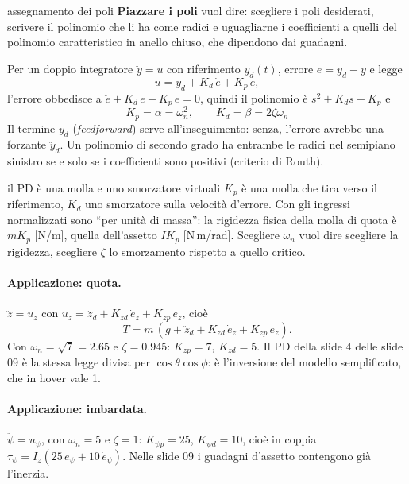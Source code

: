 \documentclass[11pt,a4paper]{article}
\begin{document}
\begin{teoria}{assegnamento dei poli}
\textbf{Piazzare i poli} vuol dire: scegliere i poli desiderati, scrivere il polinomio che li ha come radici e uguagliarne i coefficienti a quelli del polinomio caratteristico in anello chiuso, che dipendono dai guadagni.

Per un doppio integratore $\ddot y = u$ con riferimento $y_d(t)$, errore $e = y_d - y$ e legge
\[
u = \ddot y_d + K_d\,\dot e + K_p\,e ,
\]
l'errore obbedisce a $\ddot e + K_d\,\dot e + K_p\,e = 0$, quindi il polinomio è $s^2 + K_d s + K_p$ e
\[
\boxed{\ K_p = \alpha = \omega_n^2, \qquad K_d = \beta = 2\zeta\omega_n\ }
\]
Il termine $\ddot y_d$ (\emph{feedforward}) serve all'inseguimento: senza, l'errore avrebbe una forzante $\ddot y_d$. Un polinomio di secondo grado ha entrambe le radici nel semipiano sinistro se e solo se i coefficienti sono positivi (criterio di Routh).
\end{teoria}

\begin{fisica}{il PD è una molla e uno smorzatore virtuali}
$K_p$ è una molla che tira verso il riferimento, $K_d$ uno smorzatore sulla velocità d'errore. Con gli ingressi normalizzati sono ``per unità di massa'': la rigidezza fisica della molla di quota è $m K_p$ [N/m], quella dell'assetto $I K_p$ [N\,m/rad]. Scegliere $\omega_n$ vuol dire scegliere la rigidezza, scegliere $\zeta$ lo smorzamento rispetto a quello critico.
\end{fisica}

\paragraph{Applicazione: quota.} $\ddot z = u_z$ con $u_z = \ddot z_d + K_{zd}\,\dot e_z + K_{zp}\,e_z$, cioè
\[
T = m\,(g + \ddot z_d + K_{zd}\,\dot e_z + K_{zp}\,e_z).
\]
Con $\omega_n = \sqrt 7 = 2.65$ e $\zeta = 0.945$: $K_{zp} = 7$, $K_{zd} = 5$. Il PD della slide 4 delle slide 09 è la stessa legge divisa per $\cos\theta\cos\phi$: è l'inversione del modello semplificato, che in hover vale 1.

\paragraph{Applicazione: imbardata.} $\ddot\psi = u_\psi$, con $\omega_n = 5$ e $\zeta = 1$: $K_{\psi p} = 25$, $K_{\psi d} = 10$, cioè in coppia $\tau_\psi = I_z(25\,e_\psi + 10\,\dot e_\psi)$. Nelle slide 09 i guadagni d'assetto contengono già l'inerzia.
\end{document}
